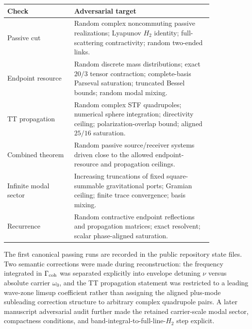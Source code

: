\begin{center}
\begin{tabular}{p{0.27\linewidth}p{0.57\linewidth}}
\toprule
Check & Adversarial target \\
\midrule
Passive cut & Random complex noncommuting passive realizations; Lyapunov $H_2$ identity; full-scattering contractivity; random two-ended links. \\
Endpoint resource & Random discrete mass distributions; exact $20/3$ tensor contraction; complete-basis Parseval saturation; truncated Bessel bounds; random modal mixing. \\
TT propagation & Random complex STF quadrupoles; numerical sphere integration; directivity ceiling; polarization-overlap bound; aligned $25/16$ saturation. \\
Combined theorem & Random passive source/receiver systems driven close to the allowed endpoint-resource and propagation ceilings. \\
Infinite modal sector & Increasing truncations of fixed square-summable gravitational ports; Gramian ceiling; finite trace convergence; basis mixing. \\
Recurrence & Random contractive endpoint reflections and propagation matrices; exact resolvent; scalar phase-aligned saturation. \\
\bottomrule
\end{tabular}
\end{center}

The first canonical passing runs are recorded in the public repository state files. Two semantic corrections were made during reconstruction: the frequency integrated in $\Gamma_{\rm coh}$ was separated explicitly into envelope detuning $\nu$ versus absolute carrier $\omega_0$, and the TT propagation statement was restricted to a leading wave-zone limsup coefficient rather than assigning the aligned plus-mode subleading correction structure to arbitrary complex quadrupole pairs. A later manuscript adversarial audit further made the retained carrier-scale modal sector, compactness conditions, and band-integral-to-full-line-$H_2$ step explicit.
